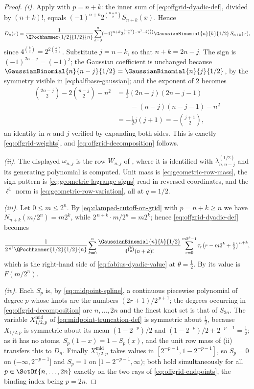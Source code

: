 \documentclass[11pt,a4paper,oneside,openany]{book}
\theoremstyle{definition}
\theoremstyle{remark}
\begin{document}
\begin{proof}
\emph{(i).}  Apply  with $p=n+k$: the inner sum of
\eqref{eq:offgrid-dyadic-def}, divided by $(n+k)!$, equals
$(-1)^{n+k}2^{\binom{n+k}{2}}S_{n+k}(x)$.  Hence
\[
 D_n(x)=\frac1{\QPochhammer{1/2}{1/2}{n}}\sum_{k=0}^{n}(-1)^{n+k}
 2^{\binom{n+k}{2}-n^2-2\binom k2}\GaussianBinomial{n}{k}{1/2}\,S_{n+k}(x),
\]
since $4^{\binom k2}=2^{2\binom k2}$.  Substitute $j=n-k$, so that $n+k=2n-j$.
The sign is $(-1)^{2n-j}=(-1)^j$; the Gaussian coefficient is unchanged because
$\GaussianBinomial{n}{n-j}{1/2}=\GaussianBinomial{n}{j}{1/2}$, by the symmetry visible in
\eqref{eq:halfbase-gaussian}; and the exponent of $2$ becomes
\begin{align*}
 \binom{2n-j}{2}-2\binom{n-j}{2}-n^2
 &=\tfrac12(2n-j)(2n-j-1)\\
 &\qquad -(n-j)(n-j-1)-n^2\\
 &=-\tfrac12 j(j+1)
 =-\binom{j+1}{2},
\end{align*}
an identity in $n$ and $j$ verified by expanding both sides.  This is exactly
\eqref{eq:offgrid-weights}, and \eqref{eq:offgrid-decomposition} follows.

\emph{(ii).}  The displayed $\omega_{n,j}$ is the row $W_{n,j}$ of
, where it is identified with
$\lambda^{(1/2)}_{n,n-j}$ and its generating polynomial is computed.  Unit mass
is \eqref{eq:geometric-row-mass}, the sign pattern is
\eqref{eq:geometric-lagrange-signs} read in reversed coordinates, and the
$\ell^1$ norm is \eqref{eq:geometric-row-variation}, all at $q=1/2$.

\emph{(iii).}  Let $0\le m\le2^n$.  By \eqref{eq:clamped-cutoff-on-grid} with
$p=n+k\ge n$ we have $N_{n+k}(m/2^n)=m2^k$, while
$2^{\,n+k}\cdot m/2^n=m2^k$; hence \eqref{eq:offgrid-dyadic-def} becomes
\[
 \frac1{2^{\,n^2}\QPochhammer{1/2}{1/2}{n}}
 \sum_{k=0}^{n}\frac{\GaussianBinomial{n}{k}{1/2}}{4^{\binom k2}(n+k)!}
 \sum_{r=0}^{m2^k-1}\tau_r\bigl(r-m2^k+\tfrac12\bigr)^{\,n+k},
\]
which is the right-hand side of \eqref{eq:fabius-dyadic-value} at
$\theta=\tfrac12$.  By  its value is
$F(m/2^n)$.

\emph{(iv).}  Each $S_p$ is, by \eqref{eq:midpoint-spline}, a continuous
piecewise polynomial of degree $p$ whose knots are the numbers
$(2r+1)/2^{\,p+1}$; the degrees occurring in
\eqref{eq:offgrid-decomposition} are $n,\ldots,2n$ and the finest knot set is
that of $S_{2n}$.  The variable $X^{\mathrm{mid}}_{1/2,p}$ of
\eqref{eq:midpoint-truncation-def} is symmetric about $\tfrac12$, because
$X_{1/2,p}$ is symmetric about its mean $(1-2^{-p})/2$ and
$(1-2^{-p})/2+2^{-p-1}=\tfrac12$; as it has no atoms, $S_p(1-x)=1-S_p(x)$, and
the unit row mass of (ii) transfers this to $D_n$.  Finally
$X^{\mathrm{mid}}_{1/2,p}$ takes values in $[2^{-p-1},1-2^{-p-1}]$, so $S_p=0$ on
$(-\infty,2^{-p-1}]$ and $S_p=1$ on $[1-2^{-p-1},\infty)$; both hold
simultaneously for all $p\in\SetOf{n,\ldots,2n}$ exactly on the two rays of
\eqref{eq:offgrid-endpoints}, the binding index being $p=2n$.
\end{proof}
\end{document}
